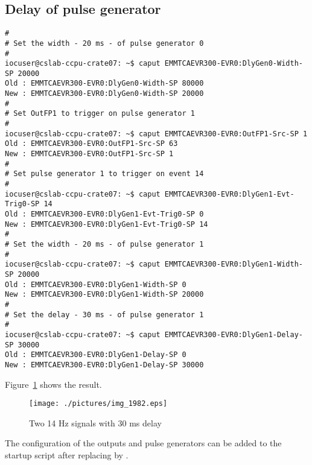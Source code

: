 \documentclass[11pt
  , a4paper
  , article
  , oneside
  , showtrims
]{memoir}
\begin{document}
{\subsection{Delay of pulse generator}
\begin{lstlisting}[style=termstyle]
#
# Set the width - 20 ms - of pulse generator 0
#
iocuser@cslab-ccpu-crate07: ~$ caput EMMTCAEVR300-EVR0:DlyGen0-Width-SP 20000
Old : EMMTCAEVR300-EVR0:DlyGen0-Width-SP 80000
New : EMMTCAEVR300-EVR0:DlyGen0-Width-SP 20000
#
# Set OutFP1 to trigger on pulse generator 1
#
iocuser@cslab-ccpu-crate07: ~$ caput EMMTCAEVR300-EVR0:OutFP1-Src-SP 1
Old : EMMTCAEVR300-EVR0:OutFP1-Src-SP 63
New : EMMTCAEVR300-EVR0:OutFP1-Src-SP 1
#
# Set pulse generator 1 to trigger on event 14
#
iocuser@cslab-ccpu-crate07: ~$ caput EMMTCAEVR300-EVR0:DlyGen1-Evt-Trig0-SP 14
Old : EMMTCAEVR300-EVR0:DlyGen1-Evt-Trig0-SP 0
New : EMMTCAEVR300-EVR0:DlyGen1-Evt-Trig0-SP 14
#
# Set the width - 20 ms - of pulse generator 1
#
iocuser@cslab-ccpu-crate07: ~$ caput EMMTCAEVR300-EVR0:DlyGen1-Width-SP 20000
Old : EMMTCAEVR300-EVR0:DlyGen1-Width-SP 0
New : EMMTCAEVR300-EVR0:DlyGen1-Width-SP 20000
#
# Set the delay - 30 ms - of pulse generator 1
#
iocuser@cslab-ccpu-crate07: ~$ caput EMMTCAEVR300-EVR0:DlyGen1-Delay-SP 30000
Old : EMMTCAEVR300-EVR0:DlyGen1-Delay-SP 0
New : EMMTCAEVR300-EVR0:DlyGen1-Delay-SP 30000
\end{lstlisting}

Figure~\ref{fig:delay} shows the result.\\

\begin{figure}[!htb]
  \centering
    \texttt{[image: ./pictures/img\_1982.eps]}
  \caption{Two 14 Hz signals with 30 ms delay}
  \label{fig:delay}
\end{figure}

The configuration of the outputs and pulse generators can be added to the startup script after  replacing  by .\\


}
\end{document}
